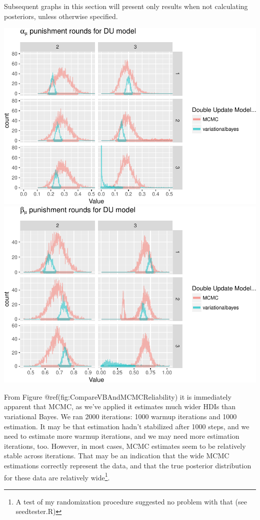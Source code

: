 \documentclass[]{article}
\let\rmarkdownfootnote\footnote%
\def\footnote{\protect\rmarkdownfootnote}
\begin{document}
Subsequent graphs in this section will present only results when not
calculating posteriors, unless otherwise specified.

\includegraphics{compare_vb_and_MCMC_doubleUpdateOnly_files/figure-latex/CompareVBAndMCMCReliability-1.pdf}
\includegraphics{compare_vb_and_MCMC_doubleUpdateOnly_files/figure-latex/CompareVBAndMCMCReliability-2.pdf}

From Figure @ref(fig:CompareVBAndMCMCReliability) it is immediately
apparent that MCMC, as we've applied it estimates much wider HDIs than
variational Bayes. We ran 2000 iterations: 1000 warmup iterations and
1000 estimation. It may be that estimation hadn't stabilized after 1000
steps, and we need to estimate more warmup iterations, and we may need
more estimation iterations, too. However, in most cases, MCMC estimates
seem to be relatively stable across iterations. That may be an
indication that the wide MCMC estimations correctly represent the data,
and that the true posterior distribution for these data are relatively
wide\footnote{A test of my randomization procedure suggested no problem with that (see seedtester.R)}.
\end{document}
